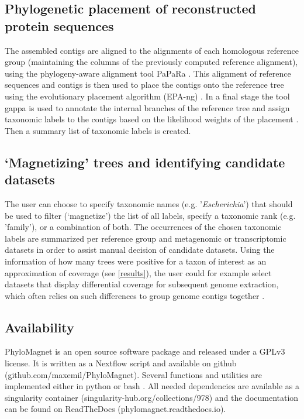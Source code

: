 \documentclass{bioinfo}
\begin{document}
\begin{methods}
\subsection{Phylogenetic placement of reconstructed protein sequences}
The assembled contigs are aligned to the alignments of each homologous reference group (maintaining the columns of the previously computed reference alignment), using the phylogeny-aware alignment tool PaPaRa \citep{Berger2011a}. This alignment of reference sequences and contigs is then used to place the contigs onto the reference tree using the evolutionary placement algorithm (EPA-ng) \citep{Berger2011b,Barbera2019}. In a final stage the tool gappa is used to annotate the internal branches of the reference tree and assign taxonomic labels to the contigs based on the likelihood weights of the placement \citep{Czech2018}. Then a summary list of taxonomic labels is created.

\subsection{‘Magnetizing’ trees and identifying candidate datasets}
The user can choose to specify taxonomic names (e.g. '\textit{Escherichia}') that should be used to filter (‘magnetize’) the list of all labels, specify a taxonomic rank (e.g. 'family'), or a combination of both. The occurrences of the chosen taxonomic labels are summarized per reference group and metagenomic or transcriptomic datasets  in order to assist manual decision of candidate datasets. Using the information of how many trees were positive for a taxon of interest as an approximation of coverage (see \ref{results}), the user could for example select datasets that display differential coverage for subsequent genome extraction, which often relies on such differences to group genome contigs together \citep{Albertsen2013,Alneberg2014}. 

\subsection{Availability}
PhyloMagnet is an open source software package and released under a GPLv3 license. It is written as a Nextflow \citep{DiTommaso2017} script and available on github (github.com/maxemil/PhyloMagnet). Several functions and utilities are implemented either in python or bash \citep{Dalke2009,Mckinney2010,Huerta-cepas2016a}. All needed dependencies are available as a singularity \citep{Kurtzer2017} container (singularity-hub.org/collections/978) and the documentation can be found on ReadTheDocs (phylomagnet.readthedocs.io).


\end{methods}
\end{document}
